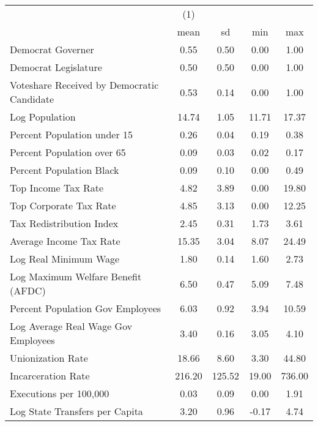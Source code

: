 \begin{tabular}{l*{1}{cccc}} \toprule
                    &\multicolumn{1}{c}{(1)}&            &            &            \\
                    &        mean&          sd&         min&         max\\
\midrule
Democrat Governer   &        0.55&        0.50&        0.00&        1.00\\
Democrat Legislature&        0.50&        0.50&        0.00&        1.00\\
Voteshare Received by Democratic Candidate&        0.53&        0.14&        0.00&        1.00\\
Log Population      &       14.74&        1.05&       11.71&       17.37\\
Percent Population under 15&        0.26&        0.04&        0.19&        0.38\\
Percent Population over 65&        0.09&        0.03&        0.02&        0.17\\
Percent Population Black&        0.09&        0.10&        0.00&        0.49\\
Top Income Tax Rate &        4.82&        3.89&        0.00&       19.80\\
Top Corporate Tax Rate&        4.85&        3.13&        0.00&       12.25\\
Tax Redistribution Index&        2.45&        0.31&        1.73&        3.61\\
Average Income Tax Rate&       15.35&        3.04&        8.07&       24.49\\
Log Real Minimum Wage&        1.80&        0.14&        1.60&        2.73\\
Log Maximum Welfare Benefit (AFDC)&        6.50&        0.47&        5.09&        7.48\\
Percent Population Gov Employees&        6.03&        0.92&        3.94&       10.59\\
Log Average Real Wage Gov Employees&        3.40&        0.16&        3.05&        4.10\\
Unionization Rate   &       18.66&        8.60&        3.30&       44.80\\
Incarceration Rate  &      216.20&      125.52&       19.00&      736.00\\
Executions per 100,000&        0.03&        0.09&        0.00&        1.91\\
Log State Transfers per Capita&        3.20&        0.96&       -0.17&        4.74\\

\end{tabular}
